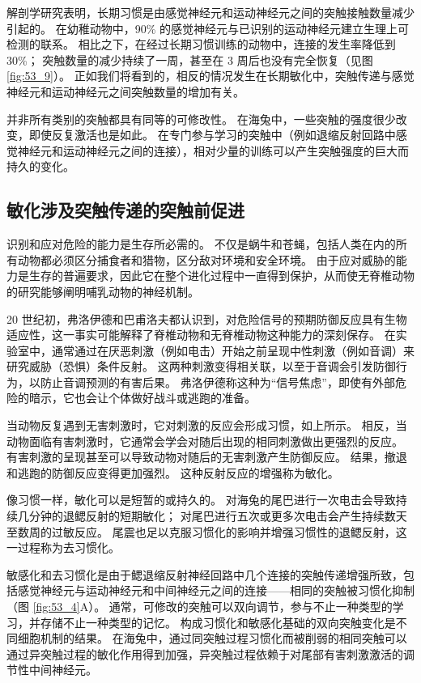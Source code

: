 解剖学研究表明，长期习惯是由感觉神经元和运动神经元之间的突触接触数量减少引起的。
在幼稚动物中，90\% 的感觉神经元与已识别的运动神经元建立生理上可检测的联系。
相比之下，在经过长期习惯训练的动物中，连接的发生率降低到 30\%；
突触数量的减少持续了一周，甚至在 3 周后也没有完全恢复（见图 \ref{fig:53_9}）。
正如我们将看到的，相反的情况发生在长期敏化中，突触传递与感觉神经元和运动神经元之间突触数量的增加有关。


并非所有类别的突触都具有同等的可修改性。
在海兔中，一些突触的强度很少改变，即使反复激活也是如此。
在专门参与学习的突触中（例如退缩反射回路中感觉神经元和运动神经元之间的连接），相对少量的训练可以产生突触强度的巨大而持久的变化。



\subsection{敏化涉及突触传递的突触前促进}

识别和应对危险的能力是生存所必需的。
不仅是蜗牛和苍蝇，包括人类在内的所有动物都必须区分捕食者和猎物，区分敌对环境和安全环境。
由于应对威胁的能力是生存的普遍要求，因此它在整个进化过程中一直得到保护，从而使无脊椎动物的研究能够阐明哺乳动物的神经机制。


20 世纪初，弗洛伊德和巴甫洛夫都认识到，对危险信号的预期防御反应具有生物适应性，这一事实可能解释了脊椎动物和无脊椎动物这种能力的深刻保存。
在实验室中，通常通过在厌恶刺激（例如电击）开始之前呈现中性刺激（例如音调）来研究威胁（恐惧）条件反射。
这两种刺激变得相关联，以至于音调会引发防御行为，以防止音调预测的有害后果。
弗洛伊德称这种为“信号焦虑”，即使有外部危险的暗示，它也会让个体做好战斗或逃跑的准备。


当动物反复遇到无害刺激时，它对刺激的反应会形成习惯，如上所示。
相反，当动物面临有害刺激时，它通常会学会对随后出现的相同刺激做出更强烈的反应。
有害刺激的呈现甚至可以导致动物对随后的无害刺激产生防御反应。
结果，撤退和逃跑的防御反应变得更加强烈。
这种反射反应的增强称为敏化。


像习惯一样，敏化可以是短暂的或持久的。
对海兔的尾巴进行一次电击会导致持续几分钟的退鳃反射的短期敏化；
对尾巴进行五次或更多次电击会产生持续数天至数周的过敏反应。
尾震也足以克服习惯化的影响并增强习惯性的退鳃反射，这一过程称为去习惯化。


敏感化和去习惯化是由于鳃退缩反射神经回路中几个连接的突触传递增强所致，包括感觉神经元与运动神经元和中间神经元之间的连接——相同的突触被习惯化抑制（图 \ref{fig:53_4}A）。
通常，可修改的突触可以双向调节，参与不止一种类型的学习，并存储不止一种类型的记忆。
构成习惯化和敏感化基础的双向突触变化是不同细胞机制的结果。
在海兔中，通过同突触过程习惯化而被削弱的相同突触可以通过异突触过程的敏化作用得到加强，异突触过程依赖于对尾部有害刺激激活的调节性中间神经元。


